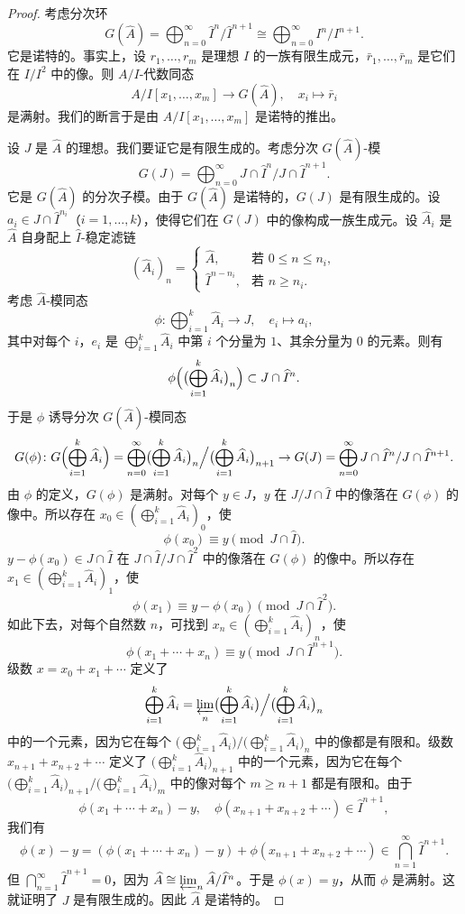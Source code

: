\begin{proof}
考虑分次环
\[
G(\widehat A)=\bigoplus_{n=0}^{\infty}\widehat I^n/\widehat I^{n+1}\cong\bigoplus_{n=0}^{\infty}I^n/I^{n+1}.
\]
它是诺特的。事实上，设 $r_1,\dots,r_m$ 是理想 $I$ 的一族有限生成元，$\bar r_1,\dots,\bar r_m$ 是它们在 $I/I^2$ 中的像。则 $A/I$-代数同态
\[
A/I[x_1,\dots,x_m]\to G(\widehat A),\quad x_i\mapsto\bar r_i
\]
是满射。我们的断言于是由 $A/I[x_1,\dots,x_m]$ 是诺特的推出。

设 $J$ 是 $\widehat A$ 的理想。我们要证它是有限生成的。考虑分次 $G(\widehat A)$-模
\[
G(J)=\bigoplus_{n=0}^{\infty}J\cap\widehat I^n/J\cap\widehat I^{n+1}.
\]
它是 $G(\widehat A)$ 的分次子模。由于 $G(\widehat A)$ 是诺特的，$G(J)$ 是有限生成的。设 $a_i\in J\cap\widehat I^{n_i}$（$i=1,\dots,k$），使得它们在 $G(J)$ 中的像构成一族生成元。设 $\widehat A_i$ 是 $\widehat A$ 自身配上 $\widehat I$-稳定滤链
\[
(\widehat A_i)_n=\begin{cases}
\widehat A, & \text{若 } 0\le n\le n_i,\\
\widehat I^{n-n_i}, & \text{若 } n\ge n_i.
\end{cases}
\]
考虑 $\widehat A$-模同态
\[
\phi\colon\bigoplus_{i=1}^{k}\widehat A_i\to J,\quad e_i\mapsto a_i,
\]
其中对每个 $i$，$e_i$ 是 $\bigoplus_{i=1}^{k}\widehat A_i$ 中第 $i$ 个分量为 $1$、其余分量为 $0$ 的元素。则有
\[
\phi\Bigl(\bigl(\bigoplus_{i=1}^{k}\widehat A_i\bigr)_n\Bigr)\subset J\cap\widehat I^n.
\]
于是 $\phi$ 诱导分次 $G(\widehat A)$-模同态
\[
G(\phi)\colon G\Bigl(\bigoplus_{i=1}^{k}\widehat A_i\Bigr)
=\bigoplus_{n=0}^{\infty}\bigl(\bigoplus_{i=1}^{k}\widehat A_i\bigr)_n\Big/\bigl(\bigoplus_{i=1}^{k}\widehat A_i\bigr)_{n+1}
\to G(J)=\bigoplus_{n=0}^{\infty}J\cap\widehat I^n/J\cap\widehat I^{n+1}.
\]
由 $\phi$ 的定义，$G(\phi)$ 是满射。对每个 $y\in J$，$y$ 在 $J/J\cap\widehat I$ 中的像落在 $G(\phi)$ 的像中。所以存在 $x_0\in(\bigoplus_{i=1}^{k}\widehat A_i)_0$，使
\[
\phi(x_0)\equiv y\pmod{J\cap\widehat I}.
\]
$y-\phi(x_0)\in J\cap\widehat I$ 在 $J\cap\widehat I/J\cap\widehat I^2$ 中的像落在 $G(\phi)$ 的像中。所以存在 $x_1\in(\bigoplus_{i=1}^{k}\widehat A_i)_1$，使
\[
\phi(x_1)\equiv y-\phi(x_0)\pmod{J\cap\widehat I^2}.
\]
如此下去，对每个自然数 $n$，可找到 $x_n\in(\bigoplus_{i=1}^{k}\widehat A_i)_n$，使
\[
\phi(x_1+\cdots+x_n)\equiv y\pmod{J\cap\widehat I^{n+1}}.
\]
级数 $x=x_0+x_1+\cdots$ 定义了
\[
\bigoplus_{i=1}^{k}\widehat A_i=\varprojlim_n\bigl(\bigoplus_{i=1}^{k}\widehat A_i\bigr)\Big/\bigl(\bigoplus_{i=1}^{k}\widehat A_i\bigr)_n
\]
中的一个元素，因为它在每个 $\bigl(\bigoplus_{i=1}^{k}\widehat A_i\bigr)/\bigl(\bigoplus_{i=1}^{k}\widehat A_i\bigr)_n$ 中的像都是有限和。级数 $x_{n+1}+x_{n+2}+\cdots$ 定义了 $\bigl(\bigoplus_{i=1}^{k}\widehat A_i\bigr)_{n+1}$ 中的一个元素，因为它在每个 $\bigl(\bigoplus_{i=1}^{k}\widehat A_i\bigr)_{n+1}/\bigl(\bigoplus_{i=1}^{k}\widehat A_i\bigr)_m$ 中的像对每个 $m\ge n+1$ 都是有限和。由于
\[
\phi(x_1+\cdots+x_n)-y,\quad \phi(x_{n+1}+x_{n+2}+\cdots)\in\widehat I^{n+1},
\]
我们有
\[
\phi(x)-y=(\phi(x_1+\cdots+x_n)-y)+\phi(x_{n+1}+x_{n+2}+\cdots)\in\bigcap_{n=1}^{\infty}\widehat I^{n+1}.
\]
但 $\bigcap_{n=1}^{\infty}\widehat I^{n+1}=0$，因为 $\widehat A\cong\varprojlim_n\widehat A/\widehat I^n$。于是 $\phi(x)=y$，从而 $\phi$ 是满射。这就证明了 $J$ 是有限生成的。因此 $\widehat A$ 是诺特的。
\end{proof}

